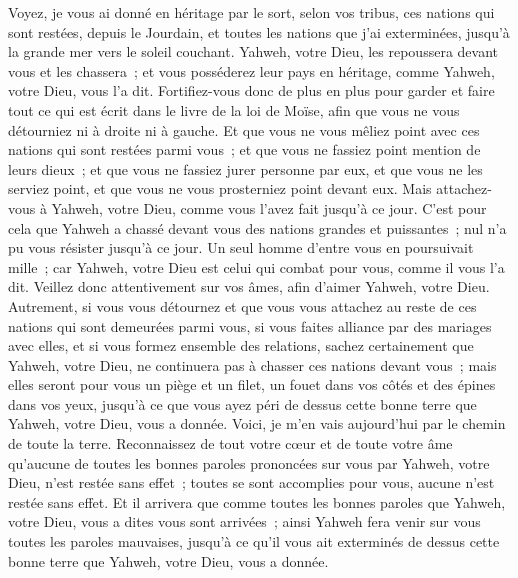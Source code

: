 \begin{multicols}{2}
Voyez, je vous ai donné en héritage par le sort, selon vos tribus, ces nations qui sont restées, depuis le Jourdain, et toutes les nations que j'ai exterminées, jusqu'à la grande mer vers le soleil couchant.
Yahweh, votre Dieu, les repoussera devant vous et les chassera~; et vous posséderez leur pays en héritage, comme Yahweh, votre Dieu, vous l'a dit.
Fortifiez-vous donc de plus en plus pour garder et faire tout ce qui est écrit dans le livre de la loi de Moïse, afin que vous ne vous détourniez ni à droite ni à gauche.
Et que vous ne vous mêliez point avec ces nations qui sont restées parmi vous~; et que vous ne fassiez point mention de leurs dieux~; et que vous ne fassiez jurer personne par eux, et que vous ne les serviez point, et que vous ne vous prosterniez point devant eux.
Mais attachez-vous à Yahweh, votre Dieu, comme vous l'avez fait jusqu'à ce jour.
C'est pour cela que Yahweh a chassé devant vous des nations grandes et puissantes~; nul n'a pu vous résister jusqu'à ce jour.
Un seul homme d'entre vous en poursuivait mille~; car Yahweh, votre Dieu est celui qui combat pour vous, comme il vous l'a dit.
Veillez donc attentivement sur vos âmes, afin d'aimer Yahweh, votre Dieu.
Autrement, si vous vous détournez et que vous vous attachez au reste de ces nations qui sont demeurées parmi vous, si vous faites alliance par des mariages avec elles, et si vous formez ensemble des relations,
sachez certainement que Yahweh, votre Dieu, ne continuera pas à chasser ces nations devant vous~; mais elles seront pour vous un piège et un filet, un fouet dans vos côtés et des épines dans vos yeux, jusqu'à ce que vous ayez péri de dessus cette bonne terre que Yahweh, votre Dieu, vous a donnée.
Voici, je m'en vais aujourd'hui par le chemin de toute la terre. Reconnaissez de tout votre cœur et de toute votre âme qu'aucune de toutes les bonnes paroles prononcées sur vous par Yahweh, votre Dieu, n'est restée sans effet~; toutes se sont accomplies pour vous, aucune n'est restée sans effet.
Et il arrivera que comme toutes les bonnes paroles que Yahweh, votre Dieu, vous a dites vous sont arrivées~; ainsi Yahweh fera venir sur vous toutes les paroles mauvaises, jusqu'à ce qu'il vous ait exterminés de dessus cette bonne terre que Yahweh, votre Dieu, vous a donnée.

\end{multicols}
